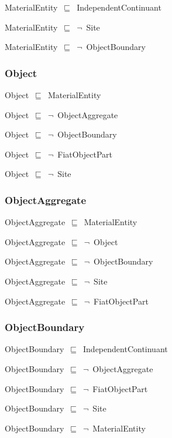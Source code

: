\documentclass{article}
\begin{document}
MaterialEntity~\ensuremath{\sqsubseteq}~IndependentContinuant~

MaterialEntity~\ensuremath{\sqsubseteq}~\ensuremath{\lnot}~Site

MaterialEntity~\ensuremath{\sqsubseteq}~\ensuremath{\lnot}~ObjectBoundary

\subsubsection*{Object}

Object~\ensuremath{\sqsubseteq}~MaterialEntity~

Object~\ensuremath{\sqsubseteq}~\ensuremath{\lnot}~ObjectAggregate

Object~\ensuremath{\sqsubseteq}~\ensuremath{\lnot}~ObjectBoundary

Object~\ensuremath{\sqsubseteq}~\ensuremath{\lnot}~FiatObjectPart

Object~\ensuremath{\sqsubseteq}~\ensuremath{\lnot}~Site

\subsubsection*{ObjectAggregate}

ObjectAggregate~\ensuremath{\sqsubseteq}~MaterialEntity~

ObjectAggregate~\ensuremath{\sqsubseteq}~\ensuremath{\lnot}~Object

ObjectAggregate~\ensuremath{\sqsubseteq}~\ensuremath{\lnot}~ObjectBoundary

ObjectAggregate~\ensuremath{\sqsubseteq}~\ensuremath{\lnot}~Site

ObjectAggregate~\ensuremath{\sqsubseteq}~\ensuremath{\lnot}~FiatObjectPart

\subsubsection*{ObjectBoundary}

ObjectBoundary~\ensuremath{\sqsubseteq}~IndependentContinuant~

ObjectBoundary~\ensuremath{\sqsubseteq}~\ensuremath{\lnot}~ObjectAggregate

ObjectBoundary~\ensuremath{\sqsubseteq}~\ensuremath{\lnot}~FiatObjectPart

ObjectBoundary~\ensuremath{\sqsubseteq}~\ensuremath{\lnot}~Site

ObjectBoundary~\ensuremath{\sqsubseteq}~\ensuremath{\lnot}~MaterialEntity
\end{document}
